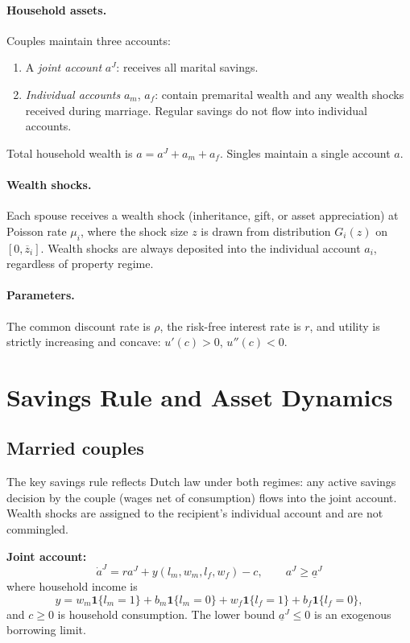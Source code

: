 \documentclass[11pt]{article}
\newcommand{\aJ}{a^{J}}
\newcommand{\aJbar}{\underline{a}^{J}}
\newcommand{\bR}{\mathbf{1}}
\begin{document}
\paragraph{Household assets.} Couples maintain three accounts:
\begin{enumerate}
    \item A \textit{joint account} $\aJ$: receives all marital savings.
    \item \textit{Individual accounts} $a_m$, $a_f$: contain premarital wealth and any wealth shocks received during marriage. Regular savings do not flow into individual accounts.
\end{enumerate}
Total household wealth is $a = \aJ + a_m + a_f$. Singles maintain a single account $a$.

\paragraph{Wealth shocks.} Each spouse receives a wealth shock (inheritance, gift, or asset appreciation) at Poisson rate $\mu_i$, where the shock size $z$ is drawn from distribution $G_i(z)$ on $[0, \overline{z}_i]$. Wealth shocks are always deposited into the individual account $a_i$, regardless of property regime.

\paragraph{Parameters.} The common discount rate is $\rho$, the risk-free interest rate is $r$, and utility is strictly increasing and concave: $u'(c) > 0$, $u''(c) < 0$.


\section{Savings Rule and Asset Dynamics}

\subsection{Married couples}

The key savings rule reflects Dutch law under both regimes: any active savings decision by the couple (wages net of consumption) flows into the joint account. Wealth shocks are assigned to the recipient's individual account and are not commingled.

\medskip
\noindent\textbf{Joint account:}
\begin{equation}
    \dot{a}^{J} = r \aJ + y(l_m, w_m, l_f, w_f) - c, \qquad \aJ \geq \aJbar
    \label{eq:joint_law}
\end{equation}
where household income is
\[
    y = w_m \bR\{l_m=1\} + b_m \bR\{l_m=0\} + w_f \bR\{l_f=1\} + b_f \bR\{l_f=0\},
\]
and $c \geq 0$ is household consumption. The lower bound $\aJbar \leq 0$ is an exogenous borrowing limit.
\end{document}
